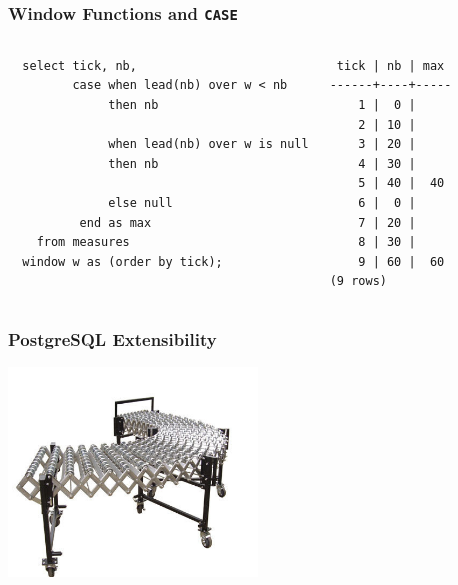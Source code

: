 \documentclass{beamer}
\begin{document}
\begin{frame}[fragile]
  \frametitle{Window Functions and \texttt{CASE}}

\begin{columns}
\begin{verbatim}
  select tick, nb,
         case when lead(nb) over w < nb
              then nb

              when lead(nb) over w is null
              then nb

              else null
          end as max
    from measures
  window w as (order by tick);
\end{verbatim}
\begin{verbatim}
 tick | nb | max 
------+----+-----
    1 |  0 |    
    2 | 10 |    
    3 | 20 |    
    4 | 30 |    
    5 | 40 |  40
    6 |  0 |    
    7 | 20 |    
    8 | 30 |    
    9 | 60 |  60
(9 rows)
\end{verbatim}
\end{columns}
\end{frame}

\begin{frame}[fragile]
  \frametitle{PostgreSQL Extensibility}

  \vfill

\begin{center}
  \includegraphics[height=15em]{extensible.jpg}
\end{center}
\end{frame}
\end{document}

